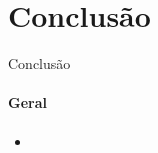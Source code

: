 \section{Conclusão}
\begin{frame}{Conclusão}
  \framesubtitle{\textcolor{fibeamer@black}{Geral}}
  
  \begin{itemize}
    \item 
  \end{itemize}
\end{frame}